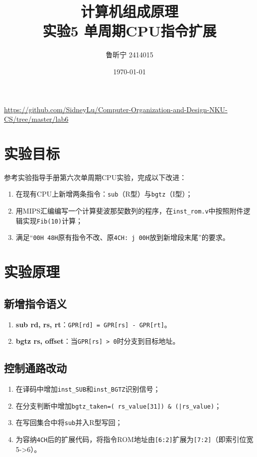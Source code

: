 ﻿\documentclass{article}
\title{计算机组成原理 \\ 实验5 单周期CPU指令扩展}
\author{鲁昕宁 2414015}
\date{\today}
\begin{document}
\maketitle
\begin{center}
    \url{https://github.com/SidneyLu/Computer-Organization-and-Design-NKU-CS/tree/master/lab6}
\end{center}

\newpage

\section{实验目标}
参考实验指导手册第六次单周期CPU实验，完成以下改进：
\begin{enumerate}
    \item 在现有CPU上新增两条指令：\texttt{sub}（R型）与\texttt{bgtz}（I型）；
    \item 用MIPS汇编编写一个计算斐波那契数列的程序，在\texttt{inst\_rom.v}中按照附件逻辑实现\texttt{Fib(10)}计算；
    \item 满足“\texttt{00H~48H}原有指令不改、原\texttt{4CH: j 00H}放到新增段末尾”的要求。
\end{enumerate}

\section{实验原理}

\subsection{新增指令语义}
\begin{enumerate}
    \item \textbf{sub rd, rs, rt}：\texttt{GPR[rd] = GPR[rs] - GPR[rt]}。
    \item \textbf{bgtz rs, offset}：当\texttt{GPR[rs] > 0}时分支到目标地址。
\end{enumerate}

\subsection{控制通路改动}
\begin{enumerate}
    \item 在译码中增加\texttt{inst\_SUB}和\texttt{inst\_BGTZ}识别信号；
    \item 在分支判断中增加\texttt{bgtz\_taken=(~rs\_value[31]) \& (|rs\_value)}；
    \item 在写回集合中将\texttt{sub}并入R型写回；
    \item 为容纳\texttt{4CH}后的扩展代码，将指令ROM地址由\texttt{[6:2]}扩展为\texttt{[7:2]}（即索引位宽5->6）。
\end{enumerate}
\end{document}

